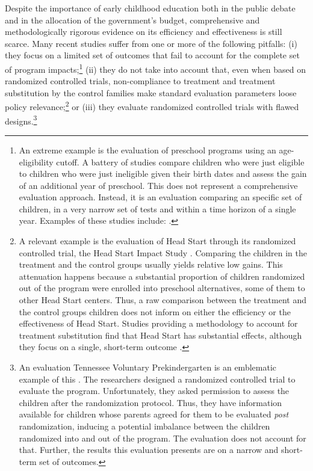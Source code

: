 \noindent Despite the importance of early childhood education both in the public debate and in the allocation of the government's budget, comprehensive and methodologically rigorous evidence on its efficiency and effectiveness  is still scarce. Many recent studies suffer from one or more of the following pitfalls: (i) they focus on a limited set of outcomes that fail to account for the complete set of program impacts;\footnote{An extreme example is the evaluation of preschool programs using an age-eligibility cutoff. A battery of studies compare children who were just eligible to children who were just ineligible given their birth dates and assess the gain of an additional year of preschool. This does not represent a comprehensive evaluation approach. Instead, it is an evaluation comparing an specific set of children, in a very narrow set of tests and within a time horizon of a single year. Examples of these studies include: \citet{Gormley_Gayer_2005_JHR,Gormley_Gayer_etal_2005_DP,Weiland_2013_CD_Impacts-of-Pre-K}.} (ii) they do not take into account that, even when based on randomized controlled trials, non-compliance to treatment and treatment substitution by the control families make standard evaluation parameters loose policy relevance;\footnote{A relevant example is the evaluation of Head Start through its randomized controlled trial, the Head Start Impact Study \citep{Puma_Bell_etal_2010_HeadStartImpact}. Comparing the children in the treatment and the control groups usually yields relative low gains. This attenuation happens because a substantial proportion of children randomized out of the program were enrolled into preschool alternatives, some of them to other Head Start centers. Thus, a raw comparison between the treatment and the control groups children does not inform on either the efficiency or the effectiveness of Head Start. Studies providing a methodology to account for treatment substitution find that Head Start has substantial effects, although they focus on a single, short-term outcome \citep{Kline-Walters_2015_NBER-Evaluating,Feller_Grindal_etal_2016_ComparedtoWhat}.} or (iii) they evaluate randomized controlled trials with flawed designs.\footnote{An evaluation Tennessee Voluntary Prekindergarten is an emblematic example of this \citep{Lipsey_et_al_2013_Tennessee_Kindergrtn_PRI,Lipsey_et_al_2015_Randomized_Control_Trial_PRI}. The researchers designed a randomized controlled trial to evaluate the program. Unfortunately, they asked permission to assess the children after the randomization protocol. Thus, they have information available for children whose parents agreed for them to be evaluated \textit{post} randomization, inducing a potential imbalance between the children randomized into and out of the program. The evaluation does not account for that. Further, the results this evaluation presents are on a narrow and short-term set of outcomes.}\\ 

